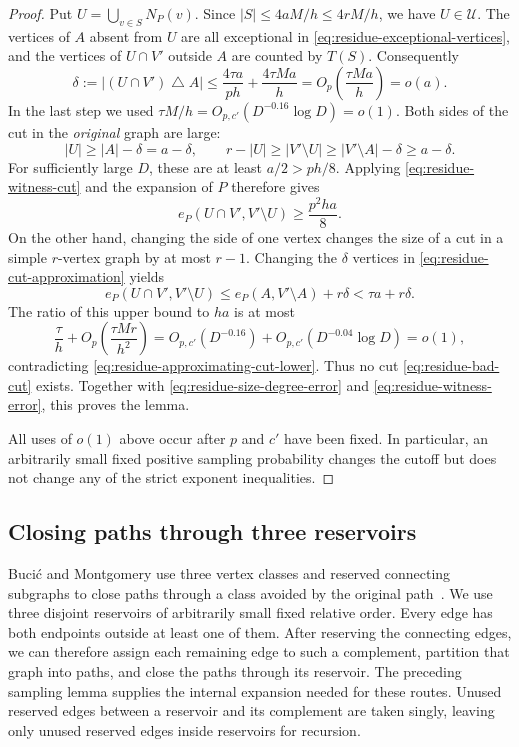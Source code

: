 \begin{proof}
Put $U=\bigcup_{v\in S}N_P(v)$.  Since
$|S|\le4aM/h\le4rM/h$, we have $U\in\mathcal U$.  The vertices of
$A$ absent from $U$ are all exceptional in
\eqref{eq:residue-exceptional-vertices}, and the vertices of
$U\cap V'$ outside $A$ are counted by $T(S)$.  Consequently
\begin{equation}\label{eq:residue-cut-approximation}
  \delta:=|(U\cap V')\mathbin{\triangle}A|
   \le\frac{4\tau a}{ph}+\frac{4\tau Ma}{h}
   =O_p\!\left(\frac{\tau Ma}{h}\right)=o(a).
\end{equation}
In the last step we used
$\tau M/h=O_{p,c'}(D^{-0.16}\log D)=o(1)$.
Both sides of the cut in the \emph{original} graph are large:
\[
  |U|\ge |A|-\delta=a-\delta,
  \qquad
  r-|U|\ge |V'\setminus U|
           \ge |V'\setminus A|-\delta\ge a-\delta.
\]
For sufficiently large $D$, these are at least $a/2>ph/8$.
Applying \eqref{eq:residue-witness-cut} and the expansion of $P$
therefore gives
\begin{equation}\label{eq:residue-approximating-cut-lower}
  e_P(U\cap V',V'\setminus U)\ge \frac{p^2ha}{8}.
\end{equation}
On the other hand, changing the side of one vertex changes the size
of a cut in a simple $r$-vertex graph by at most $r-1$.  Changing
the $\delta$ vertices in \eqref{eq:residue-cut-approximation} yields
\[
  e_P(U\cap V',V'\setminus U)
       \le e_P(A,V'\setminus A)+r\delta
       <\tau a+r\delta.
\]
The ratio of this upper bound to $ha$ is at most
\begin{equation}\label{eq:residue-cut-perturbation}
  \frac\tau h+
       O_p\!\left(\frac{\tau Mr}{h^2}\right)
  =O_{p,c'}(D^{-0.16})+
       O_{p,c'}(D^{-0.04}\log D)=o(1),
\end{equation}
contradicting \eqref{eq:residue-approximating-cut-lower}.
Thus no cut \eqref{eq:residue-bad-cut} exists.  Together with
\eqref{eq:residue-size-degree-error} and
\eqref{eq:residue-witness-error}, this proves the lemma.

All uses of $o(1)$ above occur after $p$ and $c'$ have been fixed.
In particular, an arbitrarily small fixed positive sampling
probability changes the cutoff but does not change any of the
strict exponent inequalities.
\end{proof}

\subsection{Closing paths through three reservoirs}

Buci\'c and Montgomery use three vertex classes and reserved connecting
subgraphs to close paths through a class avoided by the original
path~\cite[Section~2.2 and Lemma~23]{BM2024}. We use three disjoint reservoirs of
arbitrarily small fixed relative order. Every edge has both endpoints
outside at least one of them. After reserving the connecting edges,
we can therefore assign each remaining edge to such a complement,
partition that graph into paths, and close the paths through its
reservoir. The preceding sampling lemma supplies the internal expansion
needed for these routes. Unused reserved edges between a reservoir and
its complement are taken singly, leaving only unused reserved edges
inside reservoirs for recursion.

